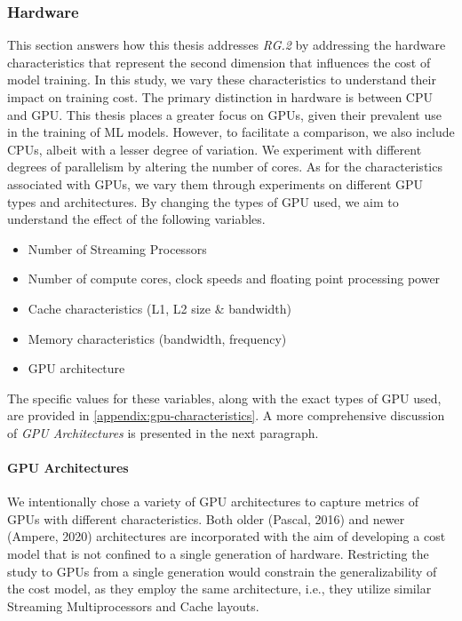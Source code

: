 \subsubsection{Hardware}
\label{subsubsec:4-hardware}
This section answers how this thesis addresses \emph{RG.2} by addressing the hardware characteristics that represent the second dimension that influences the cost of model training. In this study, we vary these characteristics to understand their impact on training cost. The primary distinction in hardware is between CPU and GPU. This thesis places a greater focus on GPUs, given their prevalent use in the training of ML models. However, to facilitate a comparison, we also include CPUs, albeit with a lesser degree of variation. We experiment with different degrees of parallelism by altering the number of cores. As for the characteristics associated with GPUs, we vary them through experiments on different GPU types and architectures. By changing the types of GPU used, we aim to understand the effect of the following variables.
\begin{itemize}
  \item Number of Streaming Processors
  \item Number of compute cores, clock speeds and floating point processing power
  \item Cache characteristics (L1, L2 size \& bandwidth)
  \item Memory characteristics (bandwidth, frequency)
  \item GPU architecture
\end{itemize}
The specific values for these variables, along with the exact types of GPU used, are provided in \autoref{appendix:gpu-characteristics}. A more comprehensive discussion of \textit{GPU Architectures} is presented in the next paragraph.

\paragraph{GPU Architectures}
We intentionally chose a variety of GPU architectures to capture metrics of GPUs with different characteristics. Both older (Pascal, 2016) and newer (Ampere, 2020) architectures are incorporated with the aim of developing a cost model that is not confined to a single generation of hardware. Restricting the study to GPUs from a single generation would constrain the generalizability of the cost model, as they employ the same architecture, i.e., they utilize similar Streaming Multiprocessors and Cache layouts.

